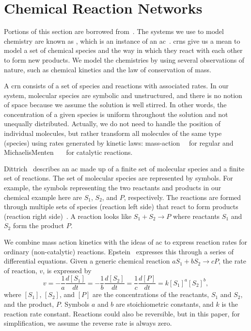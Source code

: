\section{Chemical Reaction Networks}
Portions of this section are borrowed from~\cite{Moles2014-ia}. The systems we use to model chemistry are known as , which is an instance of an \acrfull{ac}~\cite{Dittrich2001-rn}. \Glspl{crn} give us a mean to model a set of chemical species and the way in which they react with each other to form new products. We model the chemistries by using several observations of nature, such as chemical kinetics and the law of conservation of mass. 

A \gls{crn} consists of a set of species and reactions with associated rates. In our system, molecular species are symbolic and unstructured, and there is no notion of space because we assume the solution is well stirred. In other words, the concentration of a given species is uniform throughout the solution and not unequally distributed. Actually, we do not need to handle the position of individual molecules, but rather transform all molecules of the same type (species) using rates generated by kinetic laws: mass-action~\cite{Horn1972-ob}~\cite{Erdi1989-ll} for regular and Michaelis\hyph Menten~\cite{Henri1903-jf}~\cite{Michaelis1913-zv}~\cite{Leskovac2003-ei} for catalytic reactions.

Dittrich~\cite{Dittrich2001-rn} describes an \gls{ac} made up of a finite set of molecular species and a finite set of reactions. The set of molecular species are represented by symbols. For example, the symbols representing the two reactants and products in our chemical example here are $S_1$, $S_2$, and $P$, respectively. The reactions are formed through multiple sets of species (reaction left side) that react to form products (reaction right side)~\cite{Banda2013-zs}. A reaction looks like $S_1 + S_2 \rightarrow P$ where reactants $S_1$ and $S_2$ form the product $P$.

We combine mass action kinetics with the ideas of \gls{ac} to express reaction rates for ordinary (non-catalytic) reactions. Epstein~\cite{Epstein1998-qw} expresses this through a series of differential equations. Given a generic chemical reaction $aS_1 + bS_2 \rightarrow cP$, the rate of reaction, $v$, is expressed by
\begin{equation}
v = -\frac{1}{a}\frac{d[S_1]}{dt} = -\frac{1}{b}\frac{d[S_2]}{dt} = \frac{1}{c}\frac{d[P]}{dt} = k[S_1]^a[S_2]^b,
\end{equation}
where $[S_1]$, $[S_2]$, and $[P]$ are the concentrations of the reactants, $S_1$ and $S_2$, and the product, $P$. Symbols $a$ and $b$ are stoichiometric constants, and $k$ is the reaction rate constant. Reactions could also be reversible, but in this paper, for simplification, we assume the reverse rate is always zero.

